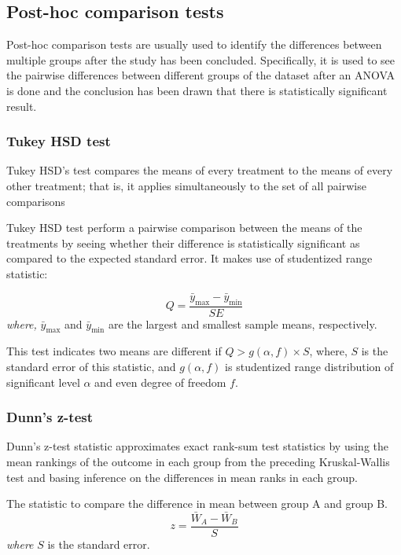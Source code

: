 \subsection{Post-hoc comparison tests}

Post-hoc comparison tests are usually used to identify the differences between multiple groups after the study has been concluded.
Specifically, it is used to see the pairwise differences between different groups of the dataset after an ANOVA is done and the conclusion
has been drawn that there is statistically significant result.\cite{foster22}

\subsubsection{Tukey HSD test}

Tukey HSD's test compares the means of every treatment to the means of every other treatment; 
that is, it applies simultaneously to the set of all pairwise comparisons

Tukey HSD test perform a pairwise comparison between the means of the treatments by seeing whether their difference
is statistically significant as compared to the expected standard error. It makes use of studentized range statistic:

\begin{equation}
    Q = \frac{\bar{y}_{\text{max}} - \bar{y}_{\text{min}}}{SE}
\end{equation}
\textit{where,} $\bar{y}_{\text{max}}$ and $\bar{y}_{\text{min}}$
are the largest and smallest sample means, respectively.

This test indicates two means are different if $Q > g(\alpha,f)\times S$\cite{tukey},
where, $S$ is the standard error of this statistic, and $g(\alpha,f)$ is studentized range 
distribution of significant level $\alpha$ and even degree of freedom $f$.

\subsubsection{Dunn's z-test}

Dunn's z-test statistic approximates exact rank-sum test statistics by using the
mean rankings of the outcome in each group from the preceding Kruskal-Wallis test
and basing inference on the differences in mean ranks in each group.\cite{dinno15}

The statistic to compare the difference in mean between group A and group B.
\begin{equation}
    z = \frac{\bar{W}_A - \bar{W}_B}{S}
\end{equation}
\textit{where} $S$ is the standard error.

